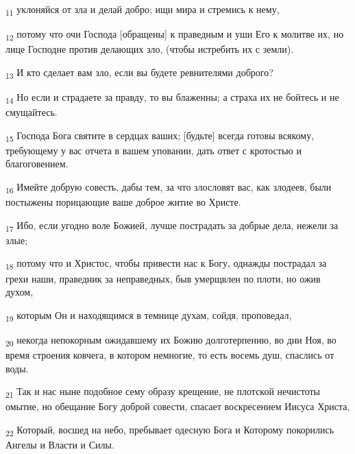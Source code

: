 \begin{tcolorbox}
\textsubscript{11} уклоняйся от зла и делай добро; ищи мира и стремись к нему,
\end{tcolorbox}
\begin{tcolorbox}
\textsubscript{12} потому что очи Господа [обращены] к праведным и уши Его к молитве их, но лице Господне против делающих зло, (чтобы истребить их с земли).
\end{tcolorbox}
\begin{tcolorbox}
\textsubscript{13} И кто сделает вам зло, если вы будете ревнителями доброго?
\end{tcolorbox}
\begin{tcolorbox}
\textsubscript{14} Но если и страдаете за правду, то вы блаженны; а страха их не бойтесь и не смущайтесь.
\end{tcolorbox}
\begin{tcolorbox}
\textsubscript{15} Господа Бога святите в сердцах ваших; [будьте] всегда готовы всякому, требующему у вас отчета в вашем уповании, дать ответ с кротостью и благоговением.
\end{tcolorbox}
\begin{tcolorbox}
\textsubscript{16} Имейте добрую совесть, дабы тем, за что злословят вас, как злодеев, были постыжены порицающие ваше доброе житие во Христе.
\end{tcolorbox}
\begin{tcolorbox}
\textsubscript{17} Ибо, если угодно воле Божией, лучше пострадать за добрые дела, нежели за злые;
\end{tcolorbox}
\begin{tcolorbox}
\textsubscript{18} потому что и Христос, чтобы привести нас к Богу, однажды пострадал за грехи наши, праведник за неправедных, быв умерщвлен по плоти, но ожив духом,
\end{tcolorbox}
\begin{tcolorbox}
\textsubscript{19} которым Он и находящимся в темнице духам, сойдя, проповедал,
\end{tcolorbox}
\begin{tcolorbox}
\textsubscript{20} некогда непокорным ожидавшему их Божию долготерпению, во дни Ноя, во время строения ковчега, в котором немногие, то есть восемь душ, спаслись от воды.
\end{tcolorbox}
\begin{tcolorbox}
\textsubscript{21} Так и нас ныне подобное сему образу крещение, не плотской нечистоты омытие, но обещание Богу доброй совести, спасает воскресением Иисуса Христа,
\end{tcolorbox}
\begin{tcolorbox}
\textsubscript{22} Который, восшед на небо, пребывает одесную Бога и Которому покорились Ангелы и Власти и Силы.
\end{tcolorbox}
